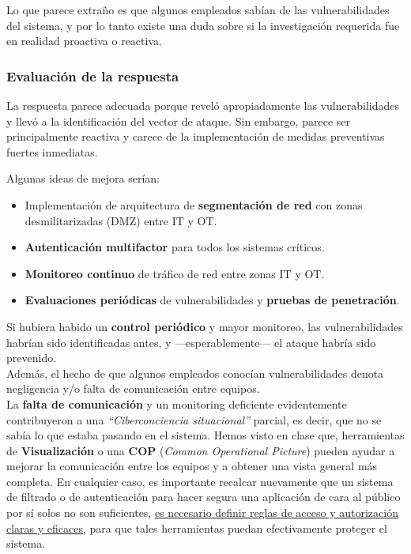 Lo que parece extraño es que algunos empleados sabían de las vulnerabilidades del sistema, y por lo tanto existe una duda sobre si la investigación requerida fue en realidad proactiva o reactiva.

\subsubsection{Evaluación de la respuesta}
La respuesta parece adecuada porque reveló apropiadamente las vulnerabilidades y llevó a la identificación del vector de ataque. Sin embargo, parece ser principalmente reactiva y carece de la implementación de medidas preventivas fuertes inmediatas.

Algunas ideas de mejora serían:
\begin{itemize}
    \item Implementación de arquitectura de \textbf{segmentación de red} con zonas desmilitarizadas (DMZ) entre \textsc{IT} y \textsc{OT}.
    \item \textbf{Autenticación multifactor} para todos los sistemas críticos.
    \item \textbf{Monitoreo continuo} de tráfico de red entre zonas \textsc{IT} y \textsc{OT}.
    \item \textbf{Evaluaciones periódicas} de vulnerabilidades y \textbf{pruebas de penetración}.
\end{itemize}

Si hubiera habido un \textbf{control periódico} y mayor monitoreo, las vulnerabilidades habrían sido identificadas antes, y ---esperablemente--- el ataque habría sido prevenido.\\
Además, el hecho de que algunos empleados conocían vulnerabilidades denota negligencia y/o falta de comunicación entre equipos.\\
La \textbf{falta de comunicación} y un monitoring deficiente evidentemente contribuyeron a una \textit{``Ciberconciencia situacional''} parcial, es decir, que no se sabía lo que estaba pasando en el sistema. Hemos visto en clase que, herramientas de \textbf{Visualización} o una \textbf{COP} (\textit{Common Operational Picture}) pueden ayudar a mejorar la comunicación entre los equipos y a obtener una vista general más completa.
En cualquier caso, es importante recalcar nuevamente que un sistema de filtrado o de autenticación para hacer segura una aplicación de cara al público por sí solos no son suficientes, \ul{es necesario definir reglas de acceso y autorización claras y eficaces}, para que tales herramientas puedan efectivamente proteger el sistema.
\newpage
